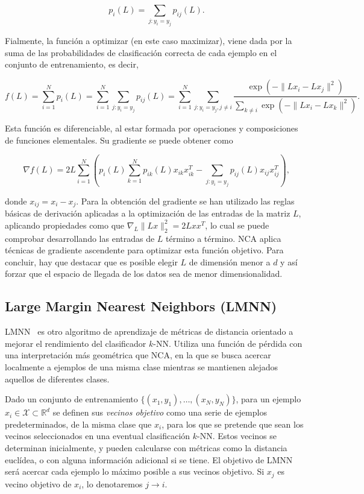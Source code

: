 \begin{equation}
    p_i(L) = \sum_{j \colon y_i = y_j} p_{ij}(L).
\end{equation}

Fialmente, la función a optimizar (en este caso maximizar), viene dada por la suma de las probabilidades de clasificación correcta de cada ejemplo en el conjunto de entrenamiento, es decir,

\[f(L) = \sum_{i=1}^N p_i(L) = \sum_{i=1}^N\sum_{j\colon y_i = y_j} p_{ij}(L) = \sum_{i=1}^N\sum_{j\colon y_i = y_j, j \ne i}\frac{\exp(-\|Lx_i-Lx_j\|^2)}{\sum_{k\ne i}\exp(-\|Lx_i-Lx_k\|^2)}.\]

Esta función es diferenciable, al estar formada por operaciones y composiciones de funciones elementales. Su gradiente se puede obtener como

\[ \nabla f(L) = 2L\sum_{i=1}^N \left(p_i(L)\sum_{k=1}^Np_{ik}(L)x_{ik}x_{ik}^T - \sum_{j\colon y_i = y_j}p_{ij}(L)x_{ij}x_{ij}^T\right), \]

donde $x_{ij} = x_i - x_j$. Para la obtención del gradiente se han utilizado las reglas básicas de derivación aplicadas a la optimización de las entradas de la matriz $L$, aplicando propiedades como que $\nabla_L\|Lx\|_2^2 = 2Lxx^T$, lo cual se puede comprobar desarrollando las entradas de $L$ término a término. NCA aplica técnicas de gradiente ascendente para optimizar esta función objetivo. Para concluir, hay que destacar que es posible elegir $L$ de dimensión menor a $d$ y así forzar que el espacio de llegada de los datos sea de menor dimensionalidad.

\subsection{Large Margin Nearest Neighbors (LMNN)}

LMNN~\parencite{weinberger2009distance} es otro algoritmo de aprendizaje de métricas de distancia orientado a mejorar el rendimiento del clasificador $k$-NN. Utiliza una función de pérdida con una interpretación más geométrica que NCA, en la que se busca acercar localmente a ejemplos de una misma clase mientras se mantienen alejados aquellos de diferentes clases.

Dado un conjunto de entrenamiento $\{(x_1, y_1),\dots,(x_N,y_N)\}$, para un ejemplo $x_i \in \mathcal{X} \subset \mathbb{R}^d$ se definen sus \emph{vecinos objetivo} como una serie de ejemplos predeterminados, de la misma clase que $x_i$, para los que se pretende que sean los vecinos seleccionados en una eventual clasificación $k$-NN. Estos vecinos se determinan inicialmente, y pueden calcularse con métricas como la distancia euclídea, o con alguna información adicional si se tiene. El objetivo de LMNN será acercar cada ejemplo lo máximo posible a sus vecinos objetivo. Si $x_j$ es vecino objetivo de $x_i$, lo denotaremos $j \rightarrow i$.

